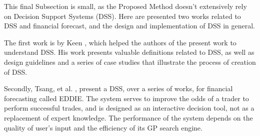 This final Subsection is small, as the Proposed Method doesn't extensively rely on Decision Support Systems (DSS). Here are presented two works related to DSS and financial forecast, and the design and implementation of DSS in general.

The first work is by Keen \cite{keen1980decision}, which helped the authors of the present work to understand DSS. His work presents valuable definitions related to DSS, as well as design guidelines and a series of case studies that illustrate the process of creation of DSS.

Secondly, Tsang, et al. \cite{tsang1998eddie} \cite{tsang2000eddie} \cite{Tsang2004}  \cite{Tsang2008}, present a DSS, over a series of works, for financial forecasting called EDDIE. The system serves to improve the odds of a trader to perform successful trades, and is designed as an interactive decision tool, not as a replacement of expert knowledge. The performance of the system depends on the quality of user's input and the efficiency of its GP search engine.
